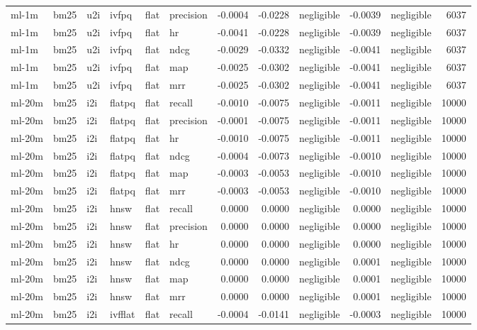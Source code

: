 \begin{tabular}{llllllrrlrlr}
ml-1m & bm25 & u2i & ivfpq & flat & precision & -0.0004 & -0.0228 & negligible & -0.0039 & negligible & 6037 \\
ml-1m & bm25 & u2i & ivfpq & flat & hr & -0.0041 & -0.0228 & negligible & -0.0039 & negligible & 6037 \\
ml-1m & bm25 & u2i & ivfpq & flat & ndcg & -0.0029 & -0.0332 & negligible & -0.0041 & negligible & 6037 \\
ml-1m & bm25 & u2i & ivfpq & flat & map & -0.0025 & -0.0302 & negligible & -0.0041 & negligible & 6037 \\
ml-1m & bm25 & u2i & ivfpq & flat & mrr & -0.0025 & -0.0302 & negligible & -0.0041 & negligible & 6037 \\
ml-20m & bm25 & i2i & flatpq & flat & recall & -0.0010 & -0.0075 & negligible & -0.0011 & negligible & 10000 \\
ml-20m & bm25 & i2i & flatpq & flat & precision & -0.0001 & -0.0075 & negligible & -0.0011 & negligible & 10000 \\
ml-20m & bm25 & i2i & flatpq & flat & hr & -0.0010 & -0.0075 & negligible & -0.0011 & negligible & 10000 \\
ml-20m & bm25 & i2i & flatpq & flat & ndcg & -0.0004 & -0.0073 & negligible & -0.0010 & negligible & 10000 \\
ml-20m & bm25 & i2i & flatpq & flat & map & -0.0003 & -0.0053 & negligible & -0.0010 & negligible & 10000 \\
ml-20m & bm25 & i2i & flatpq & flat & mrr & -0.0003 & -0.0053 & negligible & -0.0010 & negligible & 10000 \\
ml-20m & bm25 & i2i & hnsw & flat & recall & 0.0000 & 0.0000 & negligible & 0.0000 & negligible & 10000 \\
ml-20m & bm25 & i2i & hnsw & flat & precision & 0.0000 & 0.0000 & negligible & 0.0000 & negligible & 10000 \\
ml-20m & bm25 & i2i & hnsw & flat & hr & 0.0000 & 0.0000 & negligible & 0.0000 & negligible & 10000 \\
ml-20m & bm25 & i2i & hnsw & flat & ndcg & 0.0000 & 0.0000 & negligible & 0.0001 & negligible & 10000 \\
ml-20m & bm25 & i2i & hnsw & flat & map & 0.0000 & 0.0000 & negligible & 0.0001 & negligible & 10000 \\
ml-20m & bm25 & i2i & hnsw & flat & mrr & 0.0000 & 0.0000 & negligible & 0.0001 & negligible & 10000 \\
ml-20m & bm25 & i2i & ivfflat & flat & recall & -0.0004 & -0.0141 & negligible & -0.0003 & negligible & 10000 \\

\end{tabular}
